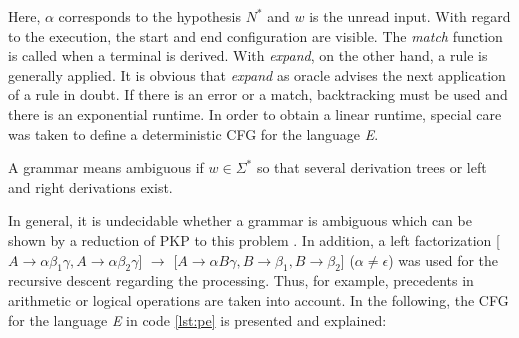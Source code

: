 Here, $\alpha$ corresponds to the hypothesis $N^*$ and $w$ is the unread input. With regard to the execution, the start and end configuration are visible. The \emph{match} function is called when a terminal is derived. With \emph{expand}, on the other hand, a rule is generally applied. It is obvious that \emph{expand} as oracle advises the next application of a rule in doubt. If there is an error or a match, backtracking must be used and there is an exponential runtime. In order to obtain a linear runtime, special care was taken to define a deterministic CFG for the language \emph{E}. 

\begin{defi}
	A grammar means ambiguous if $w \in \Sigma^*$ so that several derivation trees or left and right derivations exist.
\end{defi}

In general, it is undecidable whether a grammar is ambiguous which can be shown by a reduction of PKP to this problem \cite[p.461-462]{hmu2011}. In addition, a left factorization [$A \rightarrow \alpha \beta_1 \gamma, A \rightarrow \alpha \beta_2 \gamma$] $\rightarrow$ [$A \rightarrow \alpha B \gamma, B \rightarrow \beta_1, B \rightarrow \beta_2$] ($\alpha \neq \epsilon$) was used for the recursive descent regarding the processing. Thus, for example, precedents in arithmetic or logical operations are taken into account. In the following, the CFG for the language \emph{E} in code  \ref{lst:pe} is presented and explained:

